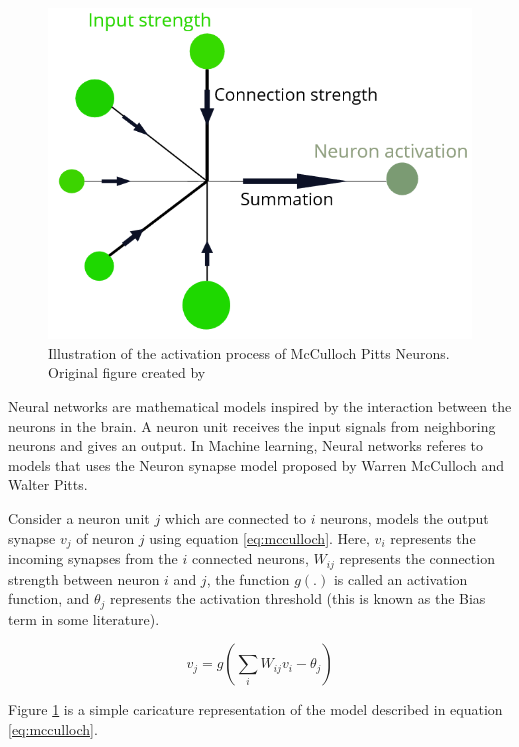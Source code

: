 \begin{figure}
    \centering
    \includegraphics[scale=0.5]{figure/neuron_activation.png}
    \caption{Illustration of the activation process of McCulloch Pitts Neurons. Original figure created by \cite{barkdeep}}
    \label{fig:mcculloch-pitts}
\end{figure}

Neural networks are mathematical models inspired by the interaction between the neurons in the brain\cite{mehligcourseslides,Goodfellow-et-al-2016}. A neuron unit receives the input signals from neighboring neurons and gives an output. In Machine learning, Neural networks referes to models that uses the Neuron synapse model proposed by Warren McCulloch and Walter Pitts\cite{McCulloch1943,hopfield1984neurons}.

Consider a neuron unit $j$ which are connected to $i$ neurons, \cite{McCulloch1943} models the output synapse $v_j$ of neuron $j$ using equation \eqref{eq:mcculloch}. Here, $v_i$ represents the incoming synapses from the $i$ connected neurons, $W_{ij}$ represents the connection strength between neuron $i$ and $j$, the function $g(.)$ is called an activation function, and $\theta_j$ represents the activation threshold (this is known as the Bias term in some literature\cite{Goodfellow-et-al-2016}).

\begin{equation}
    \label{eq:mcculloch}
    v_j = g\left(\sum_i W_{ij} v_i - \theta_j\right)
\end{equation}

Figure \ref{fig:mcculloch-pitts} is a simple caricature representation of the model described in equation \eqref{eq:mcculloch}.

